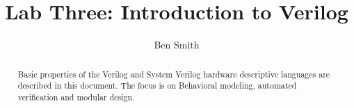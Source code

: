 
\title{Lab Three: Introduction to Verilog}
\author{Ben Smith}




  \maketitle
    \begin{abstract}
      Basic properties of the Verilog and System Verilog hardware descriptive languages are described in this document. The focus is on Behavioral modeling, automated verification and modular design.
    \end{abstract}
